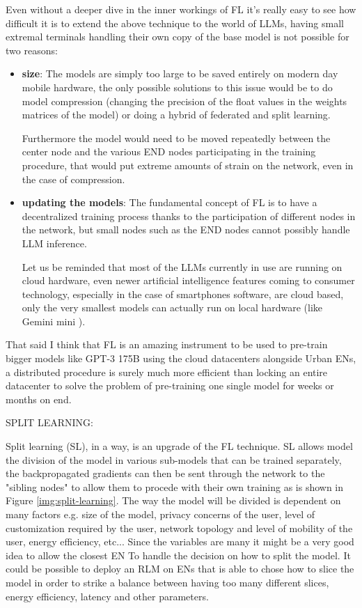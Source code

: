Even without a deeper dive in the inner workings of FL it's really easy to see how difficult it is
to extend the above technique to the world of LLMs, having small extremal terminals handling their
own copy of the base model is not possible for two reasons:
\begin{itemize}
	\item \textbf{size}: The models are simply too large to be saved entirely on modern day
	      mobile hardware, the only possible solutions to this issue would be to do model
	      compression (changing the precision of the float values in the weights matrices of
	      the model) or doing a hybrid of federated and split learning.

	      Furthermore the model would need to be moved repeatedly between the center node and
	      the various END nodes participating in the training procedure, that would put
	      extreme amounts of strain on the network, even in the case of compression.
	\item \textbf{updating the models}: The fundamental concept of FL is to have a
	      decentralized training process thanks to the participation of different nodes in
	      the network, but small nodes such as the END nodes cannot possibly handle LLM
	      inference.

	      Let us be reminded that most of the LLMs currently in use are running on cloud
	      hardware, even newer artificial intelligence features coming to consumer technology,
	      especially in the case of smartphones software, are cloud based, only the very
	      smallest models can actually run on local hardware (like Gemini mini \cite{gemini-mini}).
\end{itemize}
That said I think that FL is an amazing instrument to be used to pre-train bigger models like GPT-3
175B using the cloud datacenters alongside Urban ENs, a distributed procedure is surely much more
efficient than locking an entire datacenter to solve the problem of pre-training one single model
for weeks or months on end.

\bigskip
\noindent
SPLIT LEARNING:

Split learning (SL), in a way, is an upgrade of the FL technique.
SL allows model the division of the model in various sub-models that can be trained separately, the
backpropagated gradients can then be sent through the network to the "sibling nodes" to allow them
to procede with their own training as is shown in Figure \ref{img:split-learning}.
The way the model will be divided is dependent on many factors e.g. size of the
model, privacy concerns of the user, level of customization required by the user, network topology
and level of mobility of the user, energy efficiency, etc...
Since the variables are many it might be a very good idea to allow the closest EN To handle the
decision on how to split the model. It could be possible to deploy an RLM on ENs that is able to chose how to slice the model in order to strike a
balance between having too many different slices, energy efficiency, latency and other parameters.

